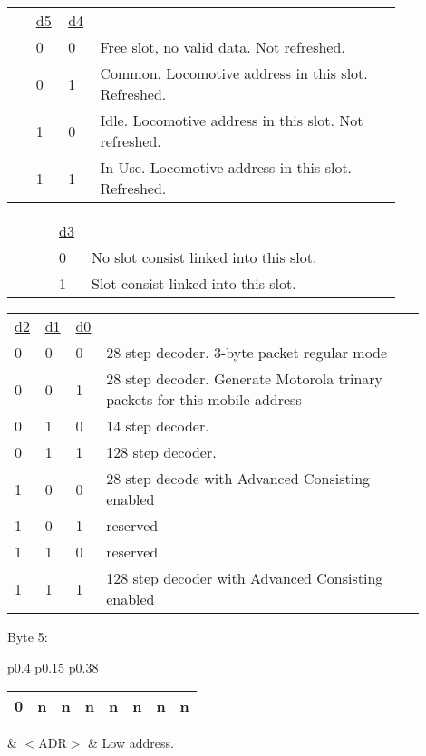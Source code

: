 \begin{tabular}{p{0.05\linewidth} p{0.05\linewidth} p{0.05\linewidth} p{0.70\linewidth}} 
& \underline{d5} & \underline{d4} & \\
& 0 & 0 & Free slot, no valid data. Not refreshed.\\
& 0 & 1 & Common. Locomotive address in this slot. Refreshed.\\
& 1 & 0 & Idle. Locomotive address in this slot. Not refreshed.\\
& 1 & 1 & In Use. Locomotive address in this slot. Refreshed. \\
\end{tabular}

 \begin{tabular}{p{0.05\linewidth} p{0.05\linewidth} p{0.05\linewidth} p{0.70\linewidth}} 
& & \underline{d3} & \\
& & 0 & No slot consist linked into this slot.\\
& & 1 & Slot consist linked into this slot.\\
\end{tabular}

\begin{tabular}{p{0.05\linewidth} p{0.05\linewidth} p{0.05\linewidth} p{0.75\linewidth}} 
\underline{d2} & \underline{d1} & \underline{d0} & \\
0 & 0 & 0 & 28 step decoder. 3-byte packet regular mode\\
0 & 0 & 1 & 28 step decoder. Generate Motorola trinary packets for this mobile address\\
0 & 1 & 0 & 14 step decoder. \\
0 & 1 & 1 & 128 step decoder. \\
1 & 0 & 0 & 28 step decode with \gls{Advanced Consisting} enabled\\
1 & 0 & 1 & reserved\\
1 & 1 & 0 & reserved\\
1 & 1 & 1 & 128 step decoder with \gls{Advanced Consisting} enabled\\
\end{tabular}

Byte 5:

\begin{tabular}{p{0.4\linewidth} p{0.15\linewidth} p{0.38\linewidth}} 

\begin{tabular}{|p{0.3cm}|p{0.3cm}|p{0.3cm}|p{0.3cm}|p{0.3cm}|p{0.3cm}|p{0.3cm}|p{0.3cm}|}
\hline
0 & n & n & n & n & n & n & n\\
\hline
\end{tabular}
& $<$ADR$>$ & Low address.\\
\end{tabular}


